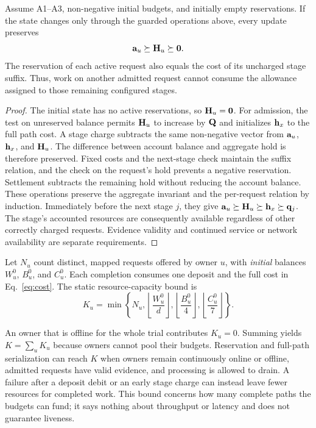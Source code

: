 \begin{proposition}
Assume A1--A3, non-negative initial budgets, and initially empty reservations.
If the state changes only through the guarded operations above, every update
preserves
\begin{equation}
\mathbf a_u\succeq\mathbf H_u\succeq\mathbf0.
\label{eq:invariant}
\end{equation}
The reservation of each active request also equals the cost of its uncharged
stage suffix. Thus, work on another admitted request cannot consume the
allowance assigned to those remaining configured stages.
\end{proposition}

\begin{proof}
The initial state has no active reservations, so $\mathbf H_u=\mathbf0$.
For admission, the test on unreserved balance permits $\mathbf H_u$ to increase
by $\mathbf Q$ and initializes $\mathbf h_x$ to the full path cost. A stage charge
subtracts the same non-negative vector from $\mathbf a_u$, $\mathbf h_x$, and $\mathbf H_u$.
The difference between account balance and aggregate hold is therefore
preserved. Fixed costs and the next-stage check maintain the suffix relation,
and the check on the request's hold prevents a negative reservation.
Settlement subtracts the remaining hold without reducing the account balance.
These operations preserve the aggregate invariant and the per-request
relation by induction. Immediately before the next stage $j$, they give
$\mathbf a_u\succeq\mathbf H_u\succeq\mathbf h_x\succeq\mathbf q_j$.
The stage's accounted resources are consequently available regardless of
other correctly charged requests. Evidence validity and continued service
or network availability are separate requirements.
\end{proof}

Let $N_u$ count distinct, mapped requests offered by owner $u$, with
\emph{initial} balances $W_u^0$, $B_u^0$, and $C_u^0$. Each completion
consumes one deposit and the full cost in Eq.~\eqref{eq:cost}. The static
resource-capacity bound is
\begin{equation}
K_u=\min\!\left\{N_u,
\left\lfloor\frac{W_u^0}{d}\right\rfloor,
\left\lfloor\frac{B_u^0}{4}\right\rfloor,
\left\lfloor\frac{C_u^0}{7}\right\rfloor\right\}.
\label{eq:bound}
\end{equation}

An owner that is offline for the whole trial contributes $K_u=0$.
Summing yields $K=\sum_u K_u$ because owners cannot pool their budgets.
Reservation and full-path serialization can reach $K$ when owners remain
continuously online or offline, admitted requests have valid evidence, and
processing is allowed to drain. A failure after a deposit debit or an early
stage charge can instead leave fewer resources for completed work. This
bound concerns how many complete paths the budgets can fund; it says nothing
about throughput or latency and does not guarantee liveness.

